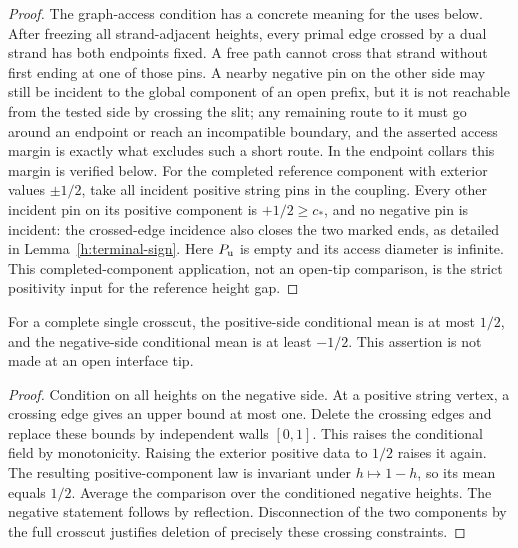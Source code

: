 \begin{proof}
The graph-access condition has a concrete meaning for the uses below.
After freezing all strand-adjacent heights, every primal edge crossed
by a dual strand has both endpoints fixed. A free path cannot cross that
strand without first ending at one of those pins. A nearby negative pin
on the other side may still be incident to the global component of an
open prefix, but it is not reachable from the tested side by crossing
the slit; any remaining route to it must go around an endpoint or reach an
incompatible boundary, and the asserted access margin is exactly what
excludes such a short route. In the endpoint collars this margin is
verified below. For the completed reference component with exterior
values $\pm1/2$, take all incident positive string pins in the coupling.
Every other incident pin on its positive component is $+1/2\ge c_*$,
and no negative pin is incident: the crossed-edge incidence also closes
the two marked ends, as detailed in Lemma~\ref{h:terminal-sign}.
Here $P_{\rm u}$ is empty and its access diameter is infinite. This
completed-component application, not an open-tip comparison, is the
strict positivity input for the reference height gap.
\end{proof}

\begin{lemma}\label{g:upper-half}
For a complete single crosscut, the positive-side conditional mean is
at most \(1/2\), and the negative-side conditional mean is at least
\(-1/2\). This assertion is not made at an open interface tip.
\end{lemma}

\begin{proof}
Condition on all heights on the negative side. At a positive string
vertex, a crossing edge gives an upper bound at most one. Delete the
crossing edges and replace these bounds by independent walls \([0,1]\).
This raises the conditional field by monotonicity. Raising the exterior
positive data to \(1/2\) raises it again. The resulting positive-component
law is invariant under \(h\mapsto1-h\), so its mean equals \(1/2\).
Average the comparison over the conditioned negative heights. The
negative statement follows by reflection. Disconnection of the two
components by the full crosscut justifies deletion of precisely these
crossing constraints.
\end{proof}

